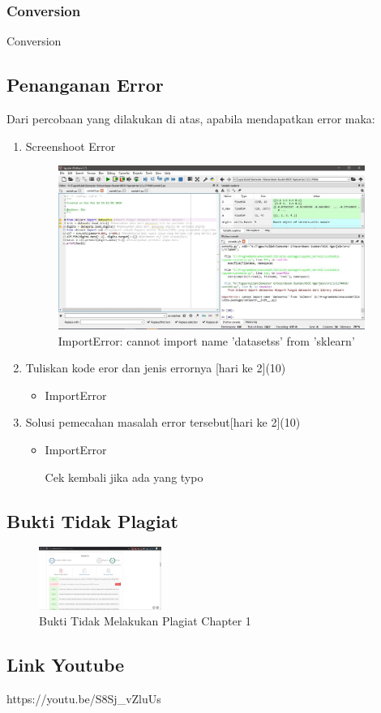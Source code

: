 \subsubsection{Conversion}
Conversion


\subsection{Penanganan Error}

Dari percobaan yang dilakukan di atas, apabila mendapatkan error maka:
\begin{enumerate}

\item Screenshoot Error
\begin{figure}[H]
	\begin{center}
   	 \includegraphics[width=10cm]{figures/1174066/1/error1.jpg}
   	 \caption{ImportError: cannot import name 'datasetss' from 'sklearn'}	
	\end{center}
\end{figure}
	
\item Tuliskan kode eror dan jenis errornya [hari ke 2](10)
\begin{itemize}
\item ImportError
\end{itemize}

\item Solusi pemecahan masalah error tersebut[hari ke 2](10)
\begin{itemize}
\item ImportError

Cek kembali jika ada yang typo
\end{itemize}

\end{enumerate}

\subsection{Bukti Tidak Plagiat}
\begin{figure}[H]
	\includegraphics[width=4cm]{figures/1174066/1/plagiat.jpg}
	\centering
	\caption{Bukti Tidak Melakukan Plagiat Chapter 1}
\end{figure}

\subsection{Link Youtube}
https://youtu.be/S8Sj\_vZluUs